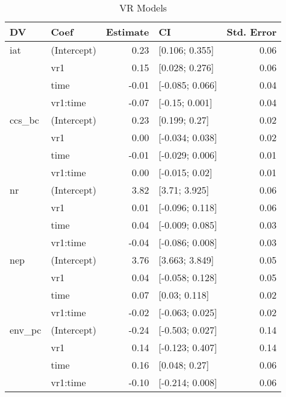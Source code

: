 \begin{table}[ht]
\centering
\begin{tabular}{llrlr}
  \hline
DV & Coef & Estimate & CI & Std. Error \\ 
  \hline
iat & (Intercept) & 0.23 & [0.106; 0.355] & 0.06 \\ 
   & vr1 & 0.15 & [0.028; 0.276] & 0.06 \\ 
   & time & -0.01 & [-0.085; 0.066] & 0.04 \\ 
   & vr1:time & -0.07 & [-0.15; 0.001] & 0.04 \\ 
   \hline
ccs\_bc & (Intercept) & 0.23 & [0.199; 0.27] & 0.02 \\ 
   & vr1 & 0.00 & [-0.034; 0.038] & 0.02 \\ 
   & time & -0.01 & [-0.029; 0.006] & 0.01 \\ 
   & vr1:time & 0.00 & [-0.015; 0.02] & 0.01 \\ 
   \hline
nr & (Intercept) & 3.82 & [3.71; 3.925] & 0.06 \\ 
   & vr1 & 0.01 & [-0.096; 0.118] & 0.06 \\ 
   & time & 0.04 & [-0.009; 0.085] & 0.03 \\ 
   & vr1:time & -0.04 & [-0.086; 0.008] & 0.03 \\ 
   \hline
nep & (Intercept) & 3.76 & [3.663; 3.849] & 0.05 \\ 
   & vr1 & 0.04 & [-0.058; 0.128] & 0.05 \\ 
   & time & 0.07 & [0.03; 0.118] & 0.02 \\ 
   & vr1:time & -0.02 & [-0.063; 0.025] & 0.02 \\ 
   \hline
env\_pc & (Intercept) & -0.24 & [-0.503; 0.027] & 0.14 \\ 
   & vr1 & 0.14 & [-0.123; 0.407] & 0.14 \\ 
   & time & 0.16 & [0.048; 0.27] & 0.06 \\ 
   & vr1:time & -0.10 & [-0.214; 0.008] & 0.06 \\ 
   \hline
\end{tabular}
\caption{VR Models } 
\label{tab:vr-models}
\end{table}
